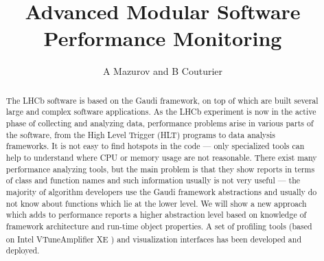 \documentclass[a4paper]{jpconf}
\begin{document}
\title{Advanced Modular Software Performance Monitoring }
\author{A Mazurov and B Couturier}
\thispagestyle{fancy}
\address{ CERN, European Organization for Nuclear Research, Geneva, Switzerland}
\address{ University of Ferrara, Ferrara, Italy}
\address{ Institute for Nuclear Research, Troitsk, Russia}




\newcommand\iamp{{Intel\textsuperscript{\textregistered} VTune\texttrademark Amplifier XE} }
\newcommand\amp{{VTune\texttrademark Amplifier XE} }
\newcommand\intel{{Intel\textsuperscript{\textregistered}} }

\begin{abstract}
The LHCb software is based on the Gaudi framework, on top of which are built several large and complex software 
applications. As the LHCb experiment is now in the active phase of collecting and analyzing data, performance problems 
arise in various parts of the software, from the High Level Trigger (HLT) programs to data analysis frameworks. 
It is not easy to find hotspots in the code --- only specialized tools can help to understand where CPU or memory usage 
are not reasonable. There exist many performance analyzing tools, but the main problem is that they show reports in 
terms of class and function names and such information usually is not very useful --- the majority of algorithm 
developers use the Gaudi framework abstractions and usually do not know about functions which lie at the lower level. 
We will show a new approach which adds to performance reports a higher abstraction level based on knowledge of 
framework architecture and run-time object properties. A set of profiling tools (based on \iamp) and visualization 
interfaces has been developed and deployed.
\end{abstract}
\end{document}
